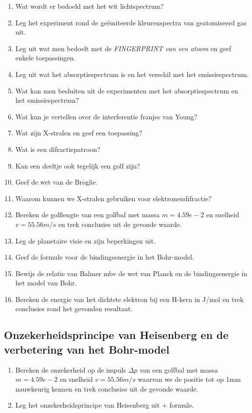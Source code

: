\documentclass[12pt]{article}
\begin{document}
    \begin{enumerate}
        \item Wat wordt er bedoeld met het wit lichtspectrum?
        \item Leg het experiment rond de geëmiteerde kleurenspectra van geatomiseerd gas uit.
        \item Leg uit wat men bedoelt met de \emph{FINGERPRINT van een atoom} en geef enkele toepassingen.
        \item Leg uit wat het absorptiespectrum is en het verschil met het emissiespectrum.
        \item Wat kan men besluiten uit de experimenten met het absorptiespectrum en het emissiespectrum?
        \item Wat kun je vertellen over de interferentie franjes van Young?
        \item Wat zijn X-stralen en geef een toepassing?
        \item Wat is een difractiepatroon?
        \item Kan een deeltje ook tegelijk een golf zijn?
        \item Geef de wet van de Broglie.
        \item Waarom kunnen we X-stralen gebruiken voor elektronendifractie?
        \item Bereken de golflengte van een golfbal met massa $m = 4.59e-2$ en
        snelheid $v = 55.56 m/s$ en trek conclusies uit de gevonde waarde.
        \item Leg de planetaire visie en zijn beperkingen uit.
        \item Geef de formule voor de bindingsenergie in het Bohr-model.
        \item Bewijs de relatie van Balmer mbv de wet van Planck en de bindingsenergie in het model van Bohr.
        \item Bereken de energie van het dichtste elektron bij een H-kern in J/mol en trek conclusies rond het gevonden resultaat.
    \end{enumerate}

    \subsection{Onzekerheidsprincipe van Heisenberg en de verbetering van het Bohr-model}

    \begin{enumerate}
        \item Bereken de onzekerheid op de impuls $\Delta p$ van een golfbal met massa $m = 4.59e-2$ en
        snelheid $v = 55.56 m/s$ waarvan we de positie tot op 1mm nauwkeurig kennen en trek conclusies uit de gevonde waarde.
        \item Leg het onzekerheidsprincipe van Heisenberg uit + formule.
    \end{enumerate}
\end{document}
